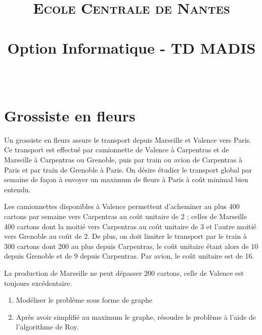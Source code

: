 \documentclass[paper=a4, fontsize=11pt]{scrartcl} %
\title{	
\normalfont \normalsize 
\textsc{Ecole Centrale de Nantes} \\ [25pt] %
\horrule{0.5pt} \\[0.4cm] %
\huge Option Informatique - TD MADIS \\ %
\horrule{2pt} \\[0.5cm] %
}
\numberwithin{equation}{section} %
\numberwithin{figure}{section} %
\numberwithin{table}{section} %
\begin{document}
\maketitle %

\section{Grossiste en fleurs}

Un grossiste en fleurs assure le transport depuis Marseille et Valence vers Paris. Ce transport est effectué par camionnette de Valence à Carpentras et de Marseille à Carpentras ou Grenoble, puis par train ou avion de Carpentras à Paris et par train de Grenoble à Paris. On désire étudier le transport global par semaine de façon à envoyer un maximum de fleurs à Paris à coût minimal bien entendu.

Les camionnettes disponibles à Valence permettent d'acheminer au plus 400 cartons par semaine vers Carpentras au coût unitaire de 2 ; celles de Marseille 400 cartons dont la moitié vers Carpentras au coût unitaire de 3 et l'autre moitié vers Grenoble au coût de 2. De plus, on doit limiter le transport par le train à 300 cartons dont 200 au plus depuis Carpentras, le coût unitaire étant alors de 10 depuis Grenoble et de 9 depuis Carpentras. Par avion, le coût unitaire est de 16. 

La production de Marseille ne peut dépasser 200 cartons, celle de Valence est toujours excédentaire.

\begin{enumerate}
\item Modéliser le problème sous forme de graphe 
\item Après avoir simplifié au maximum le graphe, résoudre le problème à l'aide de l'algorithme de Roy.

\end{enumerate}
\end{document}
